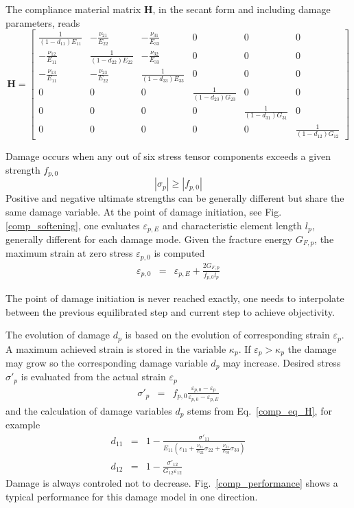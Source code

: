 \documentclass[a4paper]{article}
\begin{document}
The compliance material matrix $\mathbf{H}$, in the secant form and including damage parameters, reads
\footnotesize
\begin{equation}
\mathbf{H}=
\left[ \begin{array}{cccccc}
\frac{1}{(1-d_{11})E_{11}} & -\frac{\nu_{21}}{E_{22}} & -\frac{\nu_{31}}{E_{33}} &0 &0 & 0\\
-\frac{\nu_{12}}{E_{11}} & \frac{1}{(1-d_{22})E_{22}} & -\frac{\nu_{32}}{E_{33}} &0& 0&0\\
-\frac{\nu_{13}}{E_{11}} & -\frac{\nu_{23}}{E_{22}} & \frac{1}{(1-d_{33})E_{33}} &0 &0 &0 \\
 0&0 &0 & \frac{1}{(1-d_{23})G_{23}} & 0&0 \\
 0& 0& 0& 0& \frac{1}{(1-d_{31})G_{31}} & 0\\
 0& 0&0 &0& 0& \frac{1}{(1-d_{12})G_{12}}
\end{array} \right]\label{comp_eq_H}
\end{equation}
\normalsize

Damage occurs when any out of six stress tensor components exceeds a given strength $f_{p,0}$
\begin{equation}
|\sigma_p| \geq |f_{p,0}|
\end{equation}
Positive and negative ultimate strengths can be generally different but share the same damage variable.
At the point of damage initiation, see Fig. \ref{comp_softening}, one evaluates $\varepsilon_{p,E}$ and characteristic element length $l_p$, generally different for each damage mode. Given the fracture energy $G_{F,p}$, the maximum strain at zero stress $\varepsilon_{p,0}$ is computed
\begin{eqnarray}
\varepsilon_{p,0} &=& \varepsilon_{p,E} + \frac{2G_{F,p}}{f_{p,0} l_p}
\end{eqnarray}

The point of damage initiation is never reached exactly, one needs to interpolate between the previous equilibrated step and current step to achieve objectivity.

The evolution of damage $d_p$ is based on the evolution of corresponding strain $\varepsilon_p$. A maximum achieved strain is stored in the variable $\kappa_p$. If $\varepsilon_p > \kappa_p$ the damage may grow so the corresponding damage variable $d_p$ may increase. Desired stress $\sigma'_p$ is evaluated from the actual strain $\varepsilon_p$
\begin{eqnarray}
\sigma'_p &=& f_{p,0} \frac{\varepsilon_{p,0} - \varepsilon_p}{\varepsilon_{p,0}-\varepsilon_{p,E}}
\end{eqnarray}
and the calculation of damage variables $d_p$ stems from Eq.~\ref{comp_eq_H}, for example
\begin{eqnarray}
d_{11} &=& 1 - \frac{\sigma'_{11}}{E_{11}\left(\varepsilon_{11}+\frac{\nu_{21}}{E_{22}}\sigma_{22}+ \frac{\nu_{31}}{E_{33}}\sigma_{33} \right)}\\
d_{12} &=& 1 - \frac{\sigma'_{12}}{G_{12}\varepsilon_{12}}
\end{eqnarray}
Damage is always controled not to decrease. Fig.~\ref{comp_performance} shows a typical performance for this damage model in one direction.
\end{document}

